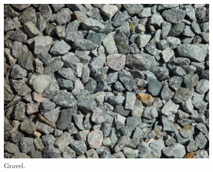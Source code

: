 \begin{figure}[!htb]
\centering
\includegraphics[width=.50\columnwidth]{images/133gravel}
\caption[Gravel]{Gravel.}
\label{fig:133gravel}
\end{figure}